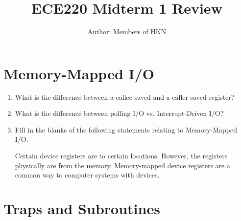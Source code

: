 \documentclass{article}
\title{ECE220 Midterm 1 Review}
\author{Author: Members of HKN}
\date{}
\newcommand{\wideunderscore}{\underline{\hphantom{n}}}
\begin{document}
\maketitle

\section {
Memory-Mapped I/O
}


\begin{enumerate}[label=(\alph*)]
    \item What is the difference between a callee-saved and a caller-saved register?
    \newline
    \newline
    \newline
    \newline
    \newline
   

    \item What is the difference between polling I/O vs. Interrupt-Driven I/O?
    \newline
    \newline
    \newline
    \newline
    \newline

    \item Fill in the blanks of the following statements relating to Memory-Mapped I/O.

    Certain device registers are \wideunderscore\wideunderscore\wideunderscore\wideunderscore\wideunderscore\wideunderscore\wideunderscore\wideunderscore to certain \wideunderscore\wideunderscore\wideunderscore\wideunderscore\wideunderscore\wideunderscore\wideunderscore\wideunderscore locations. However, the registers physically are \wideunderscore\wideunderscore\wideunderscore\wideunderscore\wideunderscore\wideunderscore\wideunderscore\wideunderscore from the memory. Memory-mapped device registers are a common way to \wideunderscore\wideunderscore\wideunderscore\wideunderscore\wideunderscore\wideunderscore\wideunderscore\wideunderscore computer systems with devices.

    

    
\end{enumerate}


\section{
    Traps and Subroutines
}
\end{document}
